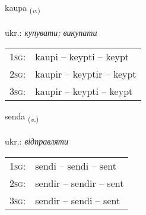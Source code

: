\documentclass[frontgrid, backgrid]{flacards}\usepackage[]{graphicx}\usepackage[]{xcolor}
\begin{document}
{kaupa \small{\textsubscript{(\textit{v.})}} \\[1ex] %
\textphonetic{[kʰœiːpa]} \\
ukr.: \emph{купувати; викупати} \\  [2ex]
\renewcommand*{\arraystretch}{0.8}
\begin{tabular}{p{1cm}l}
\textsc{1sg}: & kaupi -- keypti -- keypt \\ 
\textsc{2sg}: & kaupir -- keyptir -- keypt \\ 
\textsc{3sg}: & kaupir -- keypti -- keypt \\ 
\end{tabular}
}

\renewcommand{\flhead}{\vskip5pt \fboxsep=0pt {\small\bfseries\footnotesize Sagnorð | дієслово}}
\renewcommand{\fcfoot}{\vskip5pt \fboxsep=0pt \hspace{2pt}{\small\bfseries\footnotesize 1K}}

\renewcommand{\blhead}{\vskip5pt {\small\bfseries\footnotesize Sagnorð | дієслово }}
\renewcommand{\bcfoot}{\vskip5pt \hspace{2pt}{\small\bfseries\footnotesize 1K}}


{senda \small{\textsubscript{(\textit{v.})}} \\[1ex] %
\textphonetic{[sɛnta]} \\
ukr.: \emph{відправляти} \\  [2ex]
\renewcommand*{\arraystretch}{0.8}
\begin{tabular}{p{1cm}l}
\textsc{1sg}: & sendi -- sendi -- sent \\ 
\textsc{2sg}: & sendir -- sendir -- sent \\ 
\textsc{3sg}: & sendir -- sendi -- sent \\ 
\end{tabular}
}

\renewcommand{\flhead}{\vskip5pt \fboxsep=0pt {\small\bfseries\footnotesize Sagnorð | дієслово}}
\renewcommand{\fcfoot}{\vskip5pt \fboxsep=0pt \hspace{2pt}{\small\bfseries\footnotesize 1K}}
\end{document}
